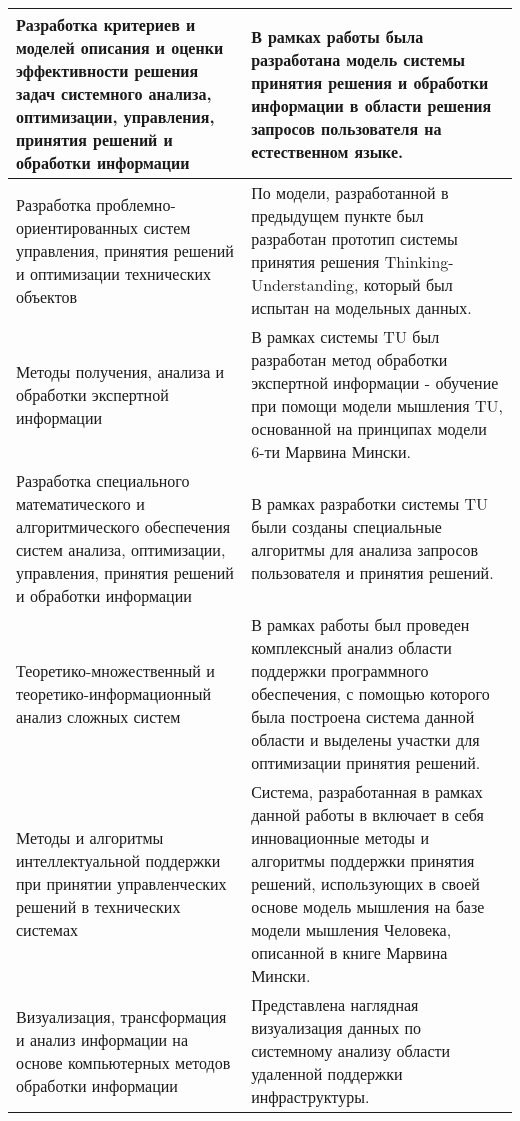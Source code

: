 \begin{longtable}{|p{7cm}|p{9cm}|}
\hline \hline
\endlastfoot
\hline
   Разработка критериев и моделей описания и оценки эффективности решения задач системного анализа, оптимизации, управления, принятия решений и обработки информации & В рамках работы была разработана модель системы принятия решения и обработки информации в области решения запросов пользователя на естественном языке. \\
   \hline
   Разработка проблемно-ориентированных систем управления, принятия решений и оптимизации технических объектов & По модели, разработанной в предыдущем пункте был разработан прототип системы принятия решения Thinking-Understanding, который был испытан на модельных данных.\\
   \hline
   Методы получения, анализа и обработки экспертной информации & В рамках системы TU был разработан метод обработки экспертной информации - обучение при помощи модели мышления TU, основанной на принципах модели 6-ти Марвина Мински. \\
   \hline
   Разработка специального математического и алгоритмического обеспечения систем анализа, оптимизации, управления, принятия решений и обработки информации & В рамках разработки системы TU были созданы специальные алгоритмы для анализа запросов пользователя и принятия решений.\\
  \hline 
  Теоретико-множественный и теоретико-информационный анализ сложных систем & В рамках работы был проведен комплексный анализ области поддержки программного обеспечения, с помощью которого была построена система данной области и выделены участки для оптимизации принятия решений.\\
  \hline
  Методы и алгоритмы интеллектуальной поддержки при принятии управленческих решений в технических системах & Система, разработанная в рамках данной работы в включает в себя инновационные методы и алгоритмы поддержки принятия решений, использующих в своей основе модель мышления на базе модели мышления Человека, описанной в книге Марвина Мински. \\ 
  \hline
  Визуализация, трансформация и анализ информации на основе компьютерных методов обработки информации & Представлена наглядная визуализация данных по системному анализу области удаленной поддержки инфраструктуры. \\
  \hline	
\end{longtable}


